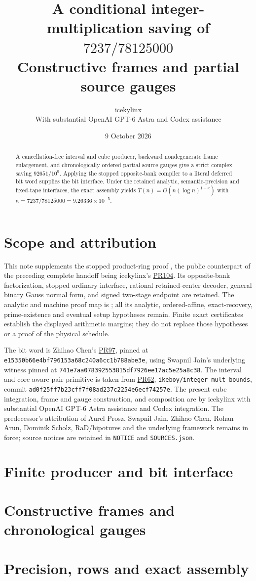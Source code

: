 \documentclass[11pt]{article}
\title{A conditional integer-multiplication saving of $7237/78125000$\\
\large Constructive frames and partial source gauges}
\author{icekylinx\\\small With substantial OpenAI GPT-6 Astra and Codex assistance}
\date{9 October 2026}
\begin{document}
\maketitle
\begin{abstract}
A cancellation-free interval and cube producer, backward nondegenerate
frame enlargement, and chronologically ordered partial source gauges give
a strict complex saving $92651/10^9$. Applying the stopped opposite-bank
compiler to a literal deferred bit word supplies the bit interface.
Under the retained analytic, semantic-precision and fixed-tape interfaces,
the exact assembly yields $T(n)=O(n(\log n)^{1-\kappa})$ with
$\kappa=7237/78125000=9.26336\times10^{-5}$.
\end{abstract}

\section{Scope and attribution}
This note supplements the stopped product-ring proof
, the public counterpart of the
preceding complete handoff being icekylinx's
\href{https://github.com/CrocSwap/integer-mult-bounds/pull/104}{PR104}.
Its opposite-bank factorization, stopped ordinary interface, rational
retained-center decoder, general binary Gauss normal form, and signed
two-stage endpoint are retained. The analytic and machine proof map is
; all its analytic, ordered-affine,
exact-recovery, prime-existence and eventual setup hypotheses remain.
Finite exact certificates establish the displayed arithmetic margins;
they do not replace those hypotheses or a proof of the physical schedule.

The bit word is Zhihao Chen's
\href{https://github.com/CrocSwap/integer-mult-bounds/pull/97}{PR97},
pinned at \texttt{e15350b66e4bf796153a68c240a6cc1b788abe3e},
using Swapnil Jain's underlying witness pinned at
\texttt{741e7aa078392553815df7926ee17ac5e25a8c38}.
The interval and core-aware pair primitive is taken from
\href{https://github.com/CrocSwap/integer-mult-bounds/pull/62}{PR62},
\texttt{ikeboy/integer-mult-bounds}, commit
\texttt{ad0f25ff7b23cff7f08ad237c2254e6ecf74257e}.
The present cube integration, frame and gauge construction, and composition
are by icekylinx with substantial OpenAI GPT-6 Astra assistance and Codex
integration. The predecessor's attribution of Aurel Prosz, Swapnil Jain,
Zhihao Chen, Rohan Arun, Dominik Scholz, RaD/hipotures and the underlying
framework remains in force; source notices are retained in
\texttt{NOTICE} and \texttt{SOURCES.json}.

\section{Finite producer and bit interface}

\section{Constructive frames and chronological gauges}

\section{Precision, rows and exact assembly}

\end{document}

